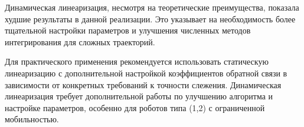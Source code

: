 Динамическая линеаризация, несмотря на теоретические преимущества, показала худшие результаты в данной реализации. Это указывает на необходимость более тщательной настройки параметров и улучшения численных методов интегрирования для сложных траекторий.

Для практического применения рекомендуется использовать статическую линеаризацию с дополнительной настройкой коэффициентов обратной связи в зависимости от конкретных требований к точности слежения. Динамическая линеаризация требует дополнительной работы по улучшению алгоритма и настройке параметров, особенно для роботов типа (1,2) с ограниченной мобильностью.

